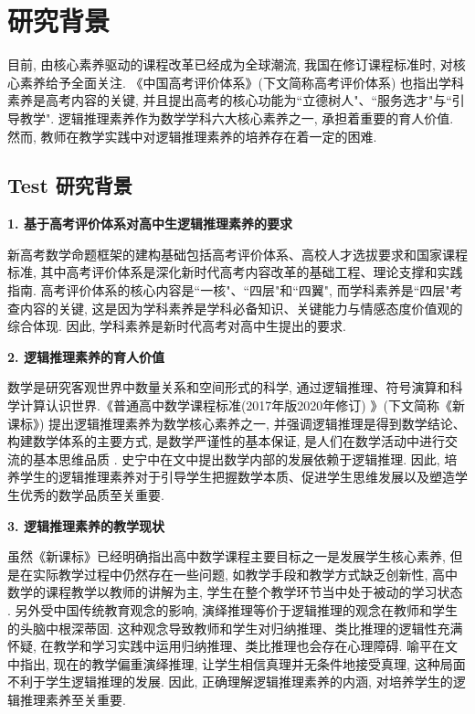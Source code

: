 \documentclass[acaddeg]{Style/SCNUThesisV3}
\begin{document}
 \section{研究背景}
 目前, 由核心素养驱动的课程改革已经成为全球潮流, 我国在修订课程标准时, 对核心素养给予全面关注. 《中国高考评价体系》(下文简称高考评价体系) 也指出学科素养是高考内容的关键, 并且提出高考的核心功能为``立德树人"、``服务选才"与``引导教学". 逻辑推理素养作为数学学科六大核心素养之一, 承担着重要的育人价值. 然而, 教师在教学实践中对逻辑推理素养的培养存在着一定的困难. 
 
\subsection{Test 研究背景}

\textbf{1. 基于高考评价体系对高中生逻辑推理素养的要求}

新高考数学命题框架的建构基础包括高考评价体系、高校人才选拔要求和国家课程标准, 其中高考评价体系是深化新时代高考内容改革的基础工程、理论支撑和实践指南. 高考评价体系的核心内容是``一核"、``四层"和``四翼", 而学科素养是``四层"考查内容的关键, 这是因为学科素养是学科必备知识、关键能力与情感态度价值观的综合体现. 因此, 学科素养是新时代高考对高中生提出的要求. 

\textbf{2. 逻辑推理素养的育人价值}

数学是研究客观世界中数量关系和空间形式的科学, 通过逻辑推理、符号演算和科学计算认识世界.《普通高中数学课程标准(2017年版2020年修订) 》(下文简称《新课标》) 提出逻辑推理素养为数学核心素养之一, 并强调逻辑推理是得到数学结论、构建数学体系的主要方式, 是数学严谨性的基本保证, 是人们在数学活动中进行交流的基本思维品质 . 史宁中在文\cite{史宁中2011数学的基本思想}中提出数学内部的发展依赖于逻辑推理. 因此, 培养学生的逻辑推理素养对于引导学生把握数学本质、促进学生思维发展以及塑造学生优秀的数学品质至关重要. 



\textbf{3. 逻辑推理素养的教学现状}

虽然《新课标》已经明确指出高中数学课程主要目标之一是发展学生核心素养, 但是在实际教学过程中仍然存在一些问题, 如教学手段和教学方式缺乏创新性, 高中数学的课程教学以教师的讲解为主, 学生在整个教学环节当中处于被动的学习状态 . 另外受中国传统教育观念的影响, 演绎推理等价于逻辑推理的观念在教师和学生的头脑中根深蒂固. 这种观念导致教师和学生对归纳推理、类比推理的逻辑性充满怀疑, 在教学和学习实践中运用归纳推理、类比推理也会存在心理障碍. 喻平在文\cite{喻平2018数学核心素养的培养}中指出, 现在的教学偏重演绎推理, 让学生相信真理并无条件地接受真理, 这种局面不利于学生逻辑推理的发展. 因此, 正确理解逻辑推理素养的内涵, 对培养学生的逻辑推理素养至关重要.
\end{document}
